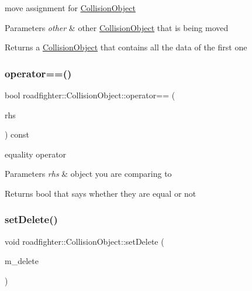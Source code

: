 move assignment for \hyperlink{classroadfighter_1_1CollisionObject}{Collision\+Object} 
\begin{DoxyParams}{Parameters}
{\em other} & other \hyperlink{classroadfighter_1_1CollisionObject}{Collision\+Object} that is being moved \\
\hline
\end{DoxyParams}
\begin{DoxyReturn}{Returns}
a \hyperlink{classroadfighter_1_1CollisionObject}{Collision\+Object} that contains all the data of the first one 
\end{DoxyReturn}
\mbox{\label{classroadfighter_1_1CollisionObject_ad93e53a2b4fdc7c7882a566b74cecfad}} 
\subsubsection{\texorpdfstring{operator==()}{operator==()}}
{\footnotesize\ttfamily bool roadfighter\+::\+Collision\+Object\+::operator== (\begin{DoxyParamCaption}\item[{const \hyperlink{classroadfighter_1_1CollisionObject}{Collision\+Object} \&}]{rhs }\end{DoxyParamCaption}) const}

equality operator 
\begin{DoxyParams}{Parameters}
{\em rhs} & object you are comparing to \\
\hline
\end{DoxyParams}
\begin{DoxyReturn}{Returns}
bool that says whether they are equal or not 
\end{DoxyReturn}
\mbox{\label{classroadfighter_1_1CollisionObject_a454547da963cd4d7e09f57bc64a0f984}} 
\subsubsection{\texorpdfstring{set\+Delete()}{setDelete()}}
{\footnotesize\ttfamily void roadfighter\+::\+Collision\+Object\+::set\+Delete (\begin{DoxyParamCaption}\item[{bool}]{m\+\_\+delete }\end{DoxyParamCaption})}

